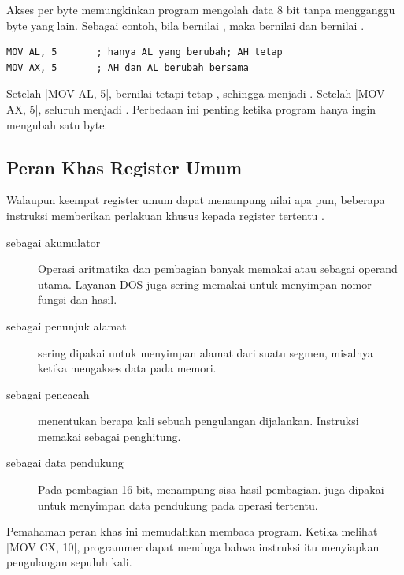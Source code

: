 Akses per byte memungkinkan program mengolah data 8 bit tanpa
mengganggu byte yang lain. Sebagai contoh, bila  bernilai
, maka  bernilai  dan  bernilai
.

\begin{lstlisting}[language=MASM, numbers=none]
MOV AL, 5       ; hanya AL yang berubah; AH tetap
MOV AX, 5       ; AH dan AL berubah bersama
\end{lstlisting}

Setelah \lstasm|MOV AL, 5|,  bernilai  tetapi
 tetap , sehingga  menjadi .
Setelah \lstasm|MOV AX, 5|, seluruh  menjadi .
Perbedaan ini penting ketika program hanya ingin mengubah satu byte.

\subsection{Peran Khas Register Umum}

Walaupun keempat register umum dapat menampung nilai apa pun,
beberapa instruksi memberikan perlakuan khusus kepada register
tertentu \cite{gunawan2019}.

\begin{description}
    \item[ sebagai akumulator] Operasi aritmatika dan
          pembagian banyak memakai  atau  sebagai
          operand utama. Layanan DOS juga sering memakai 
          untuk menyimpan nomor fungsi dan hasil.

    \item[ sebagai penunjuk alamat]  sering dipakai
          untuk menyimpan alamat  dari suatu segmen,
          misalnya ketika mengakses data pada memori.

    \item[ sebagai pencacah]  menentukan berapa kali
          sebuah pengulangan dijalankan. Instruksi 
          memakai  sebagai penghitung.

    \item[ sebagai data pendukung] Pada pembagian 16 bit,
           menampung sisa hasil pembagian.  juga
          dipakai untuk menyimpan data pendukung pada operasi
          tertentu.
\end{description}

Pemahaman peran khas ini memudahkan membaca program. Ketika melihat
\lstasm|MOV CX, 10|, programmer dapat menduga bahwa instruksi itu
menyiapkan pengulangan sepuluh kali.

